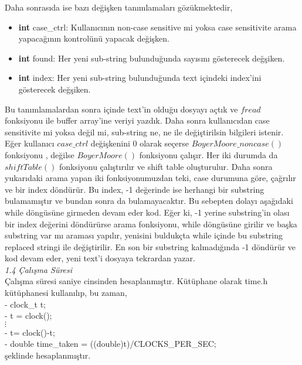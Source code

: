 \documentclass[11pt]{article}
\begin{document}
Daha sonrasıda ise bazı değişken tanımlamaları gözükmektedir,
\begin{itemize}
	\item \textbf{int} \textsf{case\_ctrl:} Kullanıcının non-case sensitive
	mi yoksa case sensitivite arama yapacağının kontrolünü yapacak
	değişken.
	\item \textbf{int} \textsf{found:} Her yeni sub-string bulunduğunda 
	sayısını gösterecek değşiken.
	\item \textbf{int} \textsf{index:} Her yeni sub-string bulunduğunda 
	text içindeki index'ini gösterecek değşiken.
\end{itemize}
Bu tanımlamalardan sonra içinde text'in olduğu dosyayı açtık ve $fread$ fonksiyonu ile buffer array'ine veriyi yazdık. Daha sonra kullanıcıdan case sensitivite mi yoksa değil mi, sub-string ne, ne ile değiştirilsin bilgileri istenir. Eğer kullanıcı $case\_ctrl$ değişkenini 0 olarak seçerse $BoyerMoore\_noncase()$ fonksiyonu , değilse $BoyerMoore()$ fonksiyonu çalışır. Her iki durumda da $shiftTable()$ fonksiyonu çalıştırılır ve shift table oluşturulur. Daha sonra yukarıdaki arama yapan iki fonksiyonumuzdan teki, case durumuna göre, çağrılır ve bir index döndürür. Bu index, -1 değerinde ise herhangi bir substring bulamamıştır ve bundan sonra da bulamayacaktır. Bu sebepten dolayı aşağıdaki while döngüsüne girmeden devam eder kod. Eğer ki, -1 yerine substring'in olası bir index değerini döndürürse
arama fonksiyonu, while döngüsüne girilir ve başka substring var mı araması yapılır, yenisini buldukçta while içinde bu substring replaced stringi ile değiştirilir. En son bir substring kalmadığında -1 döndürür ve kod devam eder, yeni text'i dosyaya tekrardan yazar.\\  
\textit{\large{1.4 Çalışma Süresi}}\\
\hspace*{1cm} Çalışma süresi saniye cinsinden hesaplanmıştır. Kütüphane olarak time.h kütüphanesi kullanılıp, bu zaman, \\
\hspace*{2cm}- clock\_t t;\\
\hspace*{2cm}- t = clock();\\
\hspace*{3cm} $\vdots$ \\
\hspace*{2cm}- t= clock()-t;\\
\hspace*{2cm}- double time\_taken = ((double)t)/CLOCKS\_PER\_SEC;\\
şeklinde hesaplanmıştır. 
\pagebreak
\end{document}

